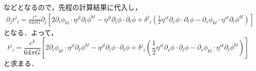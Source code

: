 \documentclass[a4paper]{ltjsreport}
\begin{document}
などとなるので，先程の計算結果に代入し，
\begin{align*}
  \partial_j{t^j}_i = \frac{c^4}{64\pi{G}}\partial_j\left[2\partial_i\phi_{kl}\cdot{}\eta^{jt}\partial_t\phi^{kl} - \eta^{jt}\partial_i\phi\cdot\partial_t\phi + {\delta^j}_i\left(\frac{1}{2}\eta^{st}\partial_s\phi\cdot\partial_t\phi - \partial_s\phi_{kl}\cdot{}\eta^{st}\partial_t\phi^{kl}\right)\right]
\end{align*}
となる．よって，
\[{t^j}_i=\frac{c^4}{64\pi{G}}\left[2\partial_i\phi_{kl}\cdot{}\eta^{jt}\partial_t\phi^{kl} - \eta^{jt}\partial_i\phi\cdot\partial_t\phi + {\delta^j}_i\left(\frac{1}{2}\eta^{st}\partial_s\phi\cdot\partial_t\phi - \partial_s\phi_{kl}\cdot{}\eta^{st}\partial_t\phi^{kl}\right)\right]\]
と求まる．
\end{document}
